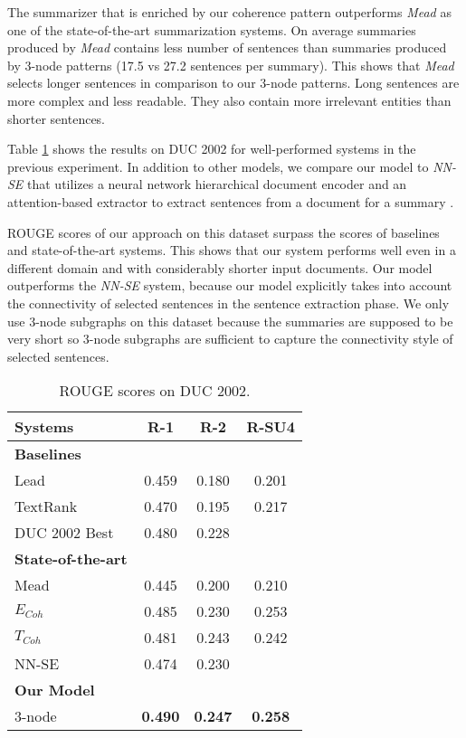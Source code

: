 The summarizer that is enriched by our coherence pattern outperforms \emph{Mead} as one of the state-of-the-art summarization systems. 
On average summaries produced by \emph{Mead} contains less number of sentences than summaries produced by 3-node patterns (17.5 vs 27.2 sentences per summary).
This shows that \emph{Mead} selects longer sentences in comparison to our 3-node patterns.  
Long sentences are more complex and less readable. 
They also contain more irrelevant entities than shorter sentences.

Table \ref{tab:summary-duc} shows the results on DUC 2002 for well-performed  systems in the previous experiment. 
In addition to other models, we compare our model to \emph{NN-SE} that utilizes a neural network hierarchical document encoder and an \mbox{attention-based} extractor to extract sentences from a document for a summary \cite{chengjianpeng16}.

ROUGE scores of our approach on this dataset surpass the scores of baselines and state-of-the-art systems. 
This shows that our system performs well even in a different domain and with considerably shorter input documents. 
Our model outperforms the \emph{NN-SE} system, because our model explicitly takes into account the connectivity of selected sentences in the sentence extraction phase. 
We only use 3-node subgraphs on this dataset because the summaries are supposed to be very short so 3-node subgraphs are sufficient to capture the connectivity style of selected sentences. 


\begin{table}[!ht]
	\begin{center}
		\begin{tabular}{lccc}
			\hline
			Systems 					& R-1 	& R-2 	& R-SU4 \\
			\hline
			\textbf{Baselines} 			&	  	&		&		\\
			Lead 						& 0.459 & 0.180 & 0.201	\\
			TextRank 					& 0.470 & 0.195 & 0.217	\\
			DUC 2002 Best 				& 0.480 & 0.228 & 		\\
			\textbf{State-of-the-art} 	& 		& 		&		\\
			Mead 						& 0.445 & 0.200 & 0.210	\\
			$E_{Coh}$ 					& 0.485 & 0.230 & 0.253 \\
			$T_{Coh}$ 					& 0.481 & 0.243 & 0.242 \\
			NN-SE 						& 0.474 & 0.230 & 		\\
			\textbf{Our Model} 			& 		& 		& 		\\
			3-node 						& \textbf{0.490} & \textbf{0.247} & \textbf{0.258}\\
			\hline
		\end{tabular}
	\end{center}
	\caption{ROUGE scores on DUC 2002.}
	\label{tab:summary-duc}
\end{table}

